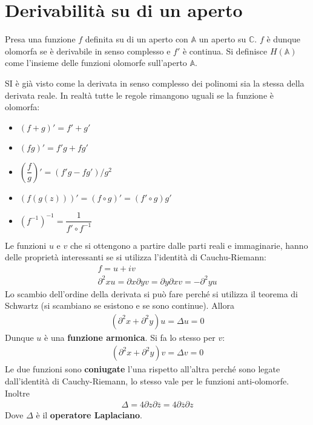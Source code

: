 \documentclass[a4paper, oneside]{article}
\begin{document}
\section{Derivabilità su di un aperto}
\begin{definition}
    Presa una funzione $f$ definita su di un aperto con $\mathbb{A}$ un aperto su $\mathbb{C}$. $f$ è dunque 
    olomorfa se è derivabile in senso complesso e $f'$ è continua. Si definisce
    $H(\mathbb{A})$ come l'insieme delle funzioni olomorfe sull'aperto $\mathbb{A}$. 
\end{definition} \noindent
SI è già visto come la derivata in senso complesso dei polinomi sia 
la stessa della derivata reale. In realtà tutte le regole rimangono uguali se la funzione è
olomorfa:
\begin{itemize}
    \item $(f + g)' = f' + g'$
    \item $(fg)' = f'g + fg'$
    \item $\left(\dfrac{f}{g}\right)' = (f'g - fg') / g^{2}  $
    \item $ \left(f(g(z))\right)' = (f \circ g)' = (f' \circ g) g'$
    \item $(f^{-1})^{-1} = \dfrac{1}{f' \circ f^{-1}}$
\end{itemize}
Le funzioni $u$ e $v$ che si ottengono a partire dalle parti reali e immaginarie,
hanno delle proprietà interessanti se si utilizza l'identità di Cauchu-Riemann:
\begin{gather*}
    f = u + iv \\
    \partial^{2}x u = \partial x \partial y v = \partial y \partial x v = - \partial ^{2}y u
\end{gather*}
Lo scambio dell'ordine della derivata si può fare perché si utilizza il teorema di Schwartz 
(si scambiano se esistono e se sono continue). Allora 
\begin{gather*}
    (\partial^{2} x + \partial^{2}y)u = \Delta u = 0 
\end{gather*}
Dunque $u$ è una \textbf{funzione armonica}. Si fa lo stesso per $v$:
\begin{gather*}
    (\partial^{2}x + \partial^{2} y) v = \Delta v = 0
\end{gather*}
Le due funzioni sono \textbf{coniugate} l'una rispetto all'altra perché
sono legate dall'identità di Cauchy-Riemann, lo stesso vale per le 
funzioni anti-olomorfe. Inoltre
\begin{gather*}
    \Delta = 4\partial z\partial \overline{z} = 4\partial \overline{z} \partial z  
\end{gather*}
Dove $\Delta$ è il \textbf{operatore Laplaciano}.
\end{document}
